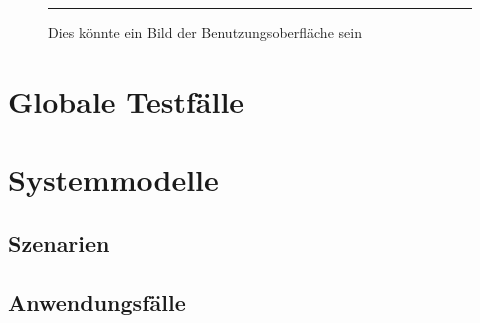 \documentclass[a4paper]{scrreprt}
\begin{document}
 
        \begin{figure}[ht]
            \centering
            \rule{8cm}{6cm}
            \caption{Dies könnte ein Bild der Benutzungsoberfläche sein}
        \end{figure}

    \chapter{Globale Testfälle}

    \chapter{Systemmodelle}

        \section{Szenarien}

        \section{Anwendungsf\"alle}

            \newpage
\end{document}
